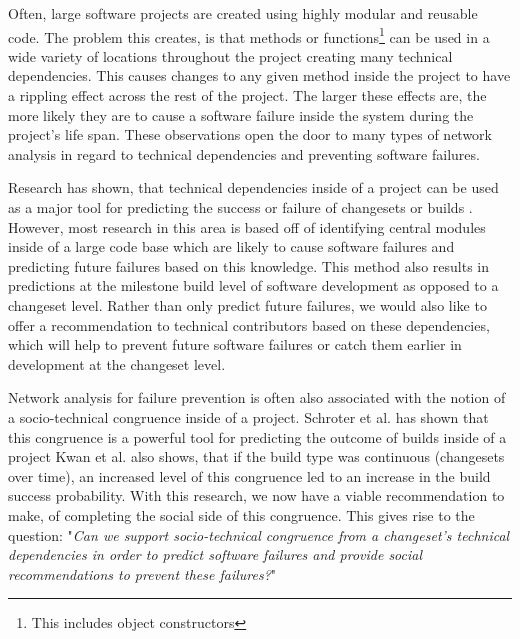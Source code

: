 \documentclass[conference]{IEEEtran}
\begin{document}
Often, large software projects are created using highly modular and 
reusable code. The problem this creates, is that methods or functions\footnote{This includes object constructors} 
can be used in a wide variety of locations throughout the project creating many technical 
dependencies.  This causes changes to any given method inside the project to have a rippling 
effect across the rest of the project\cite{Acharya:2011:PCI}. The larger these effects are,
the more likely they are to cause a software failure inside the system during the project's
life span\cite{Zimmermann:2008:PDU}. These observations open the door to many types
of network analysis in regard to technical dependencies and preventing software failures.

Research has shown, that technical dependencies inside of a project can be used as a major
tool for predicting the success or failure of changesets or builds \cite{Pinzger:2008:DNP}
\cite{Zimmermann:2008:PDU}. However, most research in this area is based off of identifying
central modules inside of a large code base which are likely to cause software failures and 
predicting future failures based on this knowledge. This method also results in predictions 
at the milestone build level of software development as opposed to a changeset level.
Rather than only predict future failures, we would also like to offer a recommendation to 
technical contributors based on these dependencies, which will help to prevent future software failures
or catch them earlier in development at the changeset level.

Network analysis for failure prevention is often also associated with the notion of a socio-technical 
congruence inside of a project\cite{Conway:1968}. Schroter et al. \cite{Schroter:2010:PBO}
has shown that this congruence is a powerful tool for predicting the outcome of builds
inside of a project Kwan et al. \cite{Kwan:2011:SD} also shows, that if the build type was continuous 
(changesets over time), an increased level of this congruence led to an increase in the build success 
probability. With this research, we now have a viable recommendation to make, of completing
the social side of this congruence. This gives rise to the question: "\textit{Can we support socio-technical 
congruence from a changeset's technical dependencies in order to predict software failures and
provide social recommendations to prevent these failures?}"
\end{document}
